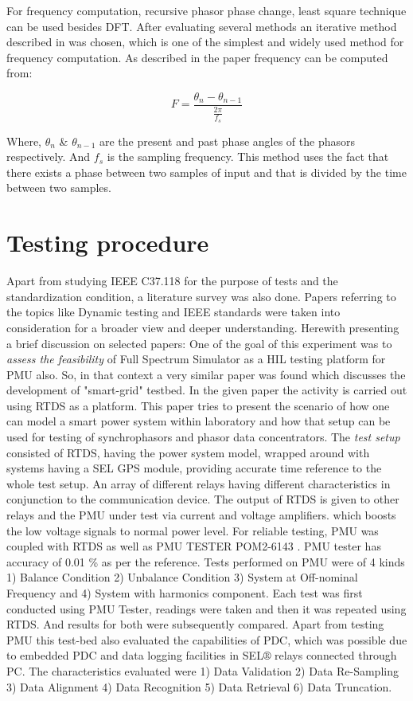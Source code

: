  For frequency computation, recursive phasor phase change, least square technique can be used besides DFT. After evaluating several methods an iterative method described in \cite{sidhu1998iterative} was chosen, which is one of the simplest and widely used method for frequency computation. As described in the paper frequency can be computed from:
 
 \begin{equation}
 F = \frac{\theta_{n} - \theta_{n-1}}{\frac{2\pi}{f_s}} 
 \end{equation}
 
 Where, $\theta_{n}$ \& $\theta_{n-1}$ are the present and past phase angles of the phasors respectively. And $f_s$ is the sampling frequency. This method uses the fact that there exists a phase between two samples of input and that is divided by the time between two samples.  
  
\section{Testing procedure}
Apart from studying IEEE C37.118 for the purpose of tests and the standardization condition, a literature survey was also done. Papers referring to the topics like Dynamic testing and IEEE standards were taken into consideration for a broader view and deeper understanding. Herewith presenting a brief discussion on selected papers:
One of the goal of this experiment was to \emph{assess the feasibility} of Full Spectrum Simulator as a HIL testing platform for PMU also. So, in that context a very similar paper was found \cite{Paper:saugata} which discusses the development of "smart-grid" testbed. In the given paper the activity is carried out using RTDS as a platform. This paper tries to present the scenario of how one can model a smart power system within laboratory and how that setup can be used for testing of synchrophasors and phasor data concentrators. The \emph{test setup} consisted of RTDS, having the power system model, wrapped around with systems having a SEL GPS module, providing accurate time reference to the whole test setup. An array of different relays having different characteristics in conjunction to the communication device. The output of RTDS is given to other relays and the PMU under test via current and voltage amplifiers. which boosts the low voltage signals to normal power level. For reliable testing, PMU was coupled with RTDS as well as PMU TESTER POM2-6143 \cite{Paper:saugata}. PMU tester has accuracy of 0.01 \% as per the reference. Tests performed on PMU were of 4 kinds 1) Balance Condition 2) Unbalance Condition 3) System at Off-nominal Frequency and 4) System with harmonics component. Each test was first conducted using PMU Tester, readings were taken and then it was repeated using RTDS. And results for both were subsequently compared. Apart from testing PMU this test-bed also evaluated the capabilities of PDC, which was possible due to embedded PDC and data logging facilities in SEL$\circledR$ relays connected through PC. The characteristics evaluated were 1) Data Validation 2) Data Re-Sampling 3) Data Alignment 4) Data Recognition 5) Data Retrieval 6) Data Truncation.

